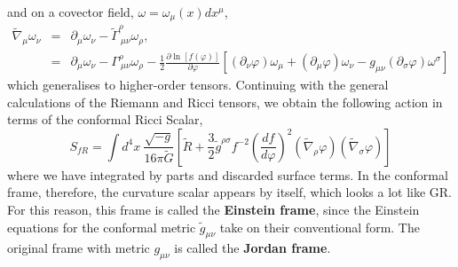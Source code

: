 and on a covector field, $\omega = \omega_{\mu} (x)dx^{\mu}$, 
\begin{eqnarray*}
    \tilde{\nabla}_{\mu}\omega_{\nu} &=& \partial_{\mu}\omega_{\nu} - \tilde{\Gamma}^{\rho}_{\ \mu\nu}\omega_{\rho},\\
    &=& \partial_{\mu}\omega_{\nu} - \Gamma^{\rho}_{\ \mu\nu}\omega_{\rho} - \frac{1}{2}\frac{\partial \ln[f(\varphi)]}{\partial \varphi}\left[(\partial_{\nu}\varphi)\omega_{\mu} + (\partial_{\mu}\varphi)\omega_{\nu} -g_{\mu\nu}(\partial_{\sigma}\varphi)\omega^{\sigma}\right]
\end{eqnarray*}
which generalises to higher-order tensors. Continuing with the general calculations of the Riemann and Ricci tensors, we obtain the following action in terms of the conformal Ricci Scalar,
\begin{equation}
    S_{fR}= \int d^4x\ \frac{\sqrt{-g}}{16\pi\tilde{G}}\left[\tilde{R} + \frac{3}{2}\tilde{g}^{\rho\sigma}f^{-2}\left(\frac{df}{d\varphi}\right)^2(\tilde{\nabla}_{\rho}\varphi)(\tilde{\nabla}_{\sigma}\varphi)\right]
\end{equation}
where we have integrated by parts and discarded surface terms. In the conformal frame, therefore, the curvature scalar appears by itself, which looks a lot like GR. For this reason, this frame is called the \textbf{Einstein frame}, since the Einstein equations for the conformal metric $\tilde{g}_{\mu\nu}$ take on their conventional form. The original frame with metric $g_{\mu\nu}$ is called the \textbf{Jordan frame}. 

